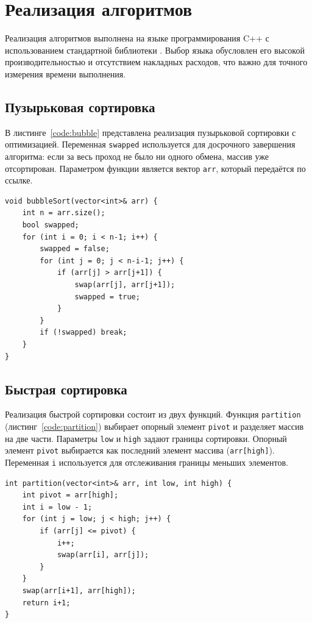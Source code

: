 \section{Реализация алгоритмов}

Реализация алгоритмов выполнена на языке программирования C++ с использованием стандартной библиотеки \cite{cppreference}. Выбор языка обусловлен его высокой производительностью и отсутствием накладных расходов, что важно для точного измерения времени выполнения.

\subsection{Пузырьковая сортировка}

В листинге~\ref{code:bubble} представлена реализация пузырьковой сортировки с оптимизацией. Переменная \texttt{swapped} используется для досрочного завершения алгоритма: если за весь проход не было ни одного обмена, массив уже отсортирован. Параметром функции является вектор \texttt{arr}, который передаётся по ссылке.

\begin{listing}[H]
\caption{Пузырьковая сортировка на C++}
\label{code:bubble}
\begin{verbatim}
void bubbleSort(vector<int>& arr) {
    int n = arr.size();
    bool swapped;
    for (int i = 0; i < n-1; i++) {
        swapped = false;
        for (int j = 0; j < n-i-1; j++) {
            if (arr[j] > arr[j+1]) {
                swap(arr[j], arr[j+1]);
                swapped = true;
            }
        }
        if (!swapped) break;
    }
}
\end{verbatim}
\end{listing}

\subsection{Быстрая сортировка}

Реализация быстрой сортировки состоит из двух функций. Функция \texttt{partition} (листинг~\ref{code:partition}) выбирает опорный элемент \texttt{pivot} и разделяет массив на две части. Параметры \texttt{low} и \texttt{high} задают границы сортировки. Опорный элемент \texttt{pivot} выбирается как последний элемент массива (\texttt{arr[high]}). Переменная \texttt{i} используется для отслеживания границы меньших элементов.

\begin{listing}[H]
\caption{Функция разделения (partition)}
\label{code:partition}
\begin{verbatim}
int partition(vector<int>& arr, int low, int high) {
    int pivot = arr[high];
    int i = low - 1;
    for (int j = low; j < high; j++) {
        if (arr[j] <= pivot) {
            i++;
            swap(arr[i], arr[j]);
        }
    }
    swap(arr[i+1], arr[high]);
    return i+1;
}
\end{verbatim}
\end{listing}

